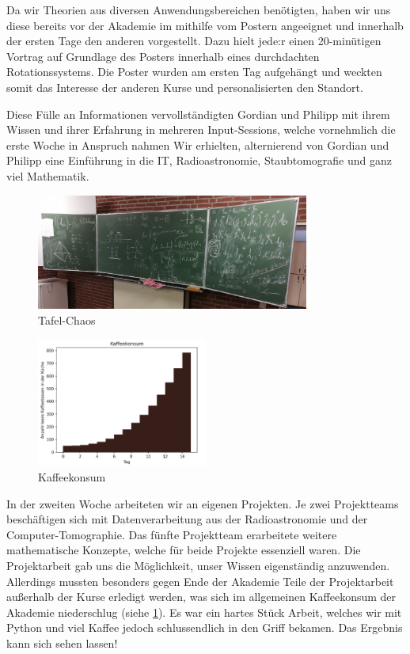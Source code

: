 Da wir Theorien aus diversen Anwendungsbereichen benötigten, haben wir uns diese bereits vor der Akademie im mithilfe vom Postern angeeignet und innerhalb der ersten Tage den anderen vorgestellt.
Dazu hielt jede:r einen 20-minütigen Vortrag auf Grundlage des Posters innerhalb eines durchdachten Rotationssystems.
Die Poster wurden am ersten Tag aufgehängt und weckten somit das Interesse der anderen Kurse und personalisierten den Standort.

Diese Fülle an Informationen vervollständigten Gordian und Philipp mit ihrem Wissen und ihrer Erfahrung in mehreren Input-Sessions, welche vornehmlich die erste Woche in Anspruch nahmen
Wir erhielten, alternierend von Gordian und Philipp eine Einführung in die IT, Radioastronomie, Staubtomografie und ganz viel Mathematik.

\begin{figure}
    \centering
    \includegraphics[width=0.8\textwidth]{k4.2/tafelbild.png}
    \caption{Tafel-Chaos}
\end{figure}

\begin{figure}
    \centering
	\includegraphics[width=0.5\textwidth]{k4.2/kaffee.png}
	\caption{Kaffeekonsum}
    \label{k4.2.fig.kaffee}
\end{figure}

In der zweiten Woche arbeiteten wir an eigenen Projekten.
Je zwei Projektteams beschäftigen sich mit Datenverarbeitung aus der Radioastronomie und der Computer-Tomographie.
Das fünfte Projektteam erarbeitete weitere mathematische Konzepte, welche für beide Projekte essenziell waren.
Die Projektarbeit gab uns die Möglichkeit, unser Wissen eigenständig anzuwenden.
Allerdings mussten besonders gegen Ende der Akademie Teile der Projektarbeit außerhalb der Kurse erledigt werden, was sich im allgemeinen Kaffeekonsum der Akademie niederschlug (siehe \cref{k4.2.fig.kaffee}).
Es war ein hartes Stück Arbeit, welches wir mit Python und viel Kaffee jedoch schlussendlich in den Griff bekamen.
Das Ergebnis kann sich sehen lassen!
